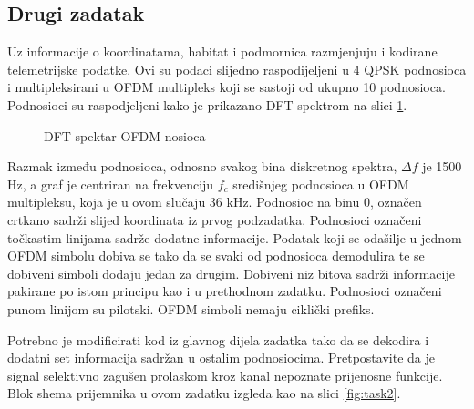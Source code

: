\documentclass[a4paper]{article}
\begin{document}
\subsection{Drugi zadatak}

Uz informacije o koordinatama, habitat i podmornica razmjenjuju i kodirane telemetrijske podatke. Ovi su podaci slijedno raspodijeljeni u 4 QPSK podnosioca i multipleksirani u OFDM  multipleks koji se sastoji od ukupno 10 podnosioca. Podnosioci su raspodjeljeni kako je prikazano DFT spektrom na slici \ref{fig:dft}.
\begin{figure}[h!]
	\centering
	\caption{DFT spektar OFDM nosioca}
	\label{fig:dft}
\end{figure}
Razmak između podnosioca, odnosno svakog bina diskretnog spektra, $\varDelta f$ je 1500 Hz, a graf je centriran na frekvenciju $f_c$ središnjeg podnosioca u OFDM multipleksu, koja je u ovom slučaju 36 kHz. Podnosioc na binu 0, označen crtkano sadrži slijed koordinata iz prvog podzadatka. Podnosioci označeni točkastim linijama sadrže dodatne informacije. Podatak koji se odašilje u jednom OFDM simbolu dobiva se tako da se svaki od podnosioca demodulira te se dobiveni simboli dodaju jedan za drugim. Dobiveni niz bitova sadrži informacije pakirane po istom principu kao i u prethodnom zadatku. Podnosioci označeni punom linijom su pilotski. OFDM simboli nemaju ciklički prefiks.

Potrebno je modificirati kod iz glavnog dijela zadatka tako da se dekodira i dodatni set informacija sadržan u ostalim podnosiocima. Pretpostavite da je signal selektivno zagušen prolaskom kroz kanal nepoznate prijenosne funkcije. Blok shema prijemnika u ovom zadatku izgleda kao na slici \ref{fig:task2}.
\end{document}
